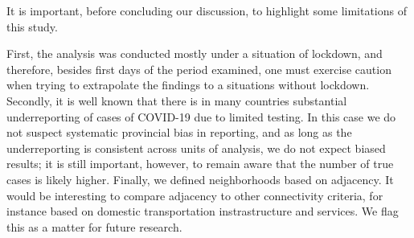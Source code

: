 \documentclass[]{elsarticle} %
\begin{document}
It is important, before concluding our discussion, to highlight some
limitations of this study.

First, the analysis was conducted mostly under a situation of lockdown,
and therefore, besides first days of the period examined, one must
exercise caution when trying to extrapolate the findings to a situations
without lockdown. Secondly, it is well known that there is in many
countries substantial underreporting of cases of COVID-19 due to limited
testing. In this case we do not suspect systematic provincial bias in
reporting, and as long as the underreporting is consistent across units
of analysis, we do not expect biased results; it is still important,
however, to remain aware that the number of true cases is likely higher.
Finally, we defined neighborhoods based on adjacency. It would be
interesting to compare adjacency to other connectivity criteria, for
instance based on domestic transportation instrastructure and services.
We flag this as a matter for future research.
\end{document}
